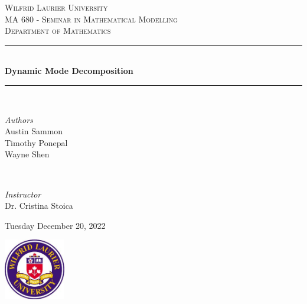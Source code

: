 \documentclass[12pt]{report}
\begin{document}
\begin{titlepage} 
	\newcommand{\HRule}{\rule{\linewidth}{0.5mm}} 
	\center 
	
	\textsc{\LARGE Wilfrid Laurier University}\\[1.5cm] %
	
	\textsc{\Large MA 680 - Seminar in Mathematical Modelling}\\[0.5cm] %
	
	\textsc{\large Department of Mathematics}\\[0.5cm] %
	
	\HRule\\[0.4cm]
	{\huge\bfseries Dynamic Mode Decomposition}\\[0.4cm] %
	
	\HRule\\[1.5cm]
	\begin{minipage}{0.4\textwidth}
		\begin{flushleft}
			\large
			\textit{Authors}\\
			Austin Sammon \\Timothy Ponepal \\Wayne Shen %
		\end{flushleft}
	\end{minipage}
	~
	\begin{minipage}{0.4\textwidth}
		\begin{flushright}
			\large
			\textit{Instructor}\\
			Dr. Cristina Stoica %
		\end{flushright}
	\end{minipage}
	\vfill\vfill\vfill
	
	{\large Tuesday December 20, 2022} %
	
	\vfill\vfill\vfill
	\includegraphics[width=0.2\textwidth]{Wlu_colour_logo.jpg}\\[0.1cm] 
	
	\vfill
	
\end{titlepage}

\end{document}
